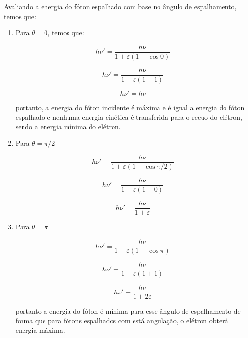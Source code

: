 \documentclass[11pt,a4paper]{article}
\begin{document}
            \noindent Avaliando a energia do fóton espalhado com base no ângulo de espalhamento, temos que:

                \begin{enumerate}
                    \item Para $\theta = 0$, temos que:
                    
                        $$h\nu' = \frac{h\nu}{1 + \varepsilon (1 - \cos 0)}$$

                        $$h\nu' = \frac{h\nu}{1 + \varepsilon (1 - 1)}$$

                        \begin{equation}
                            h\nu' = h\nu
                        \end{equation}

                        \noindent portanto, a energia do fóton incidente é máxima e é igual a energia do fóton espalhado e nenhuma energia cinética é transferida para o recuo do elétron, sendo a energia mínima do elétron.

                    \item Para $\theta = \pi/2$
                    
                        $$h\nu' = \frac{h\nu}{1 + \varepsilon (1 - \cos \pi/2)}$$

                        $$h\nu' = \frac{h\nu}{1 + \varepsilon (1 - 0)}$$

                        \begin{equation}
                            h\nu' = \frac{h\nu}{1 + \varepsilon}
                        \end{equation}


                    \item Para $\theta = \pi$
                    
                        $$h\nu' = \frac{h\nu}{1 + \varepsilon (1 - \cos \pi)}$$

                        $$h\nu' = \frac{h\nu}{1 + \varepsilon (1 + 1)}$$

                        \begin{equation}
                            h\nu' = \frac{h\nu}{1 + 2\varepsilon}
                        \end{equation}
                        
                        \noindent portanto a energia do fóton é mínima para esse ângulo de espalhamento de forma que para fótons espalhados com está angulação, o elétron obterá energia máxima.


\end{enumerate}
\end{document}
